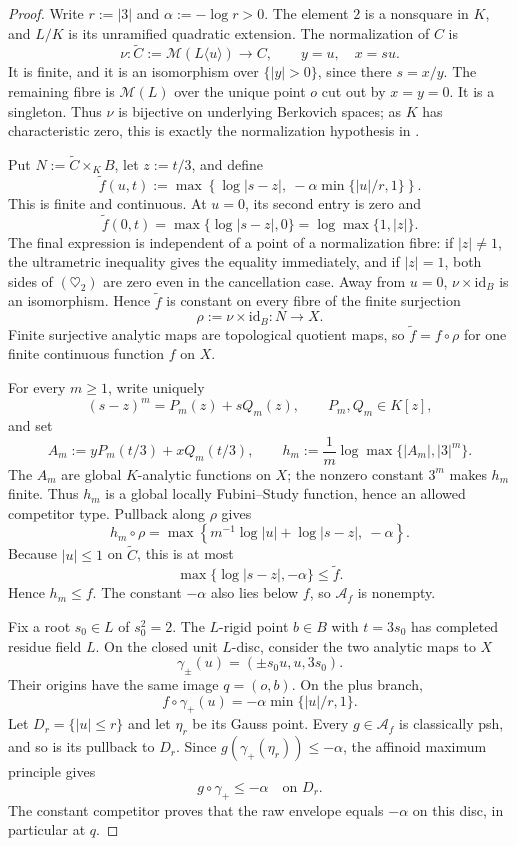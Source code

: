 \begin{proof}
Write \(r:=|3|\) and \(\alpha:=-\log r>0\).  The element \(2\) is a
nonsquare in \(K\), and \(L/K\) is its unramified quadratic extension.  The
normalization of \(C\) is
\[
 \nu:\widetilde C:=\mathcal M(L\langle u\rangle)\longrightarrow C,
 \qquad y=u,\quad x=su.
 \tag{\(\heartsuit\)}
\]
It is finite, and it is an isomorphism over \(\{|y|>0\}\), since there
\(s=x/y\).  The remaining fibre is \(\mathcal M(L)\) over the unique
point \(o\) cut out by \(x=y=0\).  It is a singleton.  Thus \(\nu\) is
bijective on underlying Berkovich spaces; as \(K\) has characteristic zero,
this is exactly the normalization hypothesis in
.

Put \(N:=\widetilde C\times_K B\), let \(z:=t/3\), and define
\[
 \widetilde f(u,t):=
 \max\left\{\log|s-z|,\ -\alpha\min\{|u|/r,1\}\right\}.
 \tag{\(\heartsuit_1\)}
\]
This is finite and continuous.  At \(u=0\), its second entry is zero and
\[
 \widetilde f(0,t)=\max\{\log|s-z|,0\}
                    =\log\max\{1,|z|\}.
 \tag{\(\heartsuit_2\)}
\]
The final expression is independent of a point of a normalization fibre:
if \(|z|\ne1\), the ultrametric inequality gives the equality immediately,
and if \(|z|=1\), both sides of \((\heartsuit_2)\) are zero even in the
cancellation case.  Away from \(u=0\), \(\nu\times\mathrm{id}_B\) is an
isomorphism.  Hence \(\widetilde f\) is constant on every fibre of the
finite surjection
\[
 \rho:=\nu\times\mathrm{id}_B:N\longrightarrow X.
\]
Finite surjective analytic maps are topological quotient maps, so
\(\widetilde f=f\circ\rho\) for one finite continuous function \(f\) on
\(X\).

For every \(m\ge1\), write uniquely
\[
 (s-z)^m=P_m(z)+sQ_m(z),\qquad P_m,Q_m\in K[z],
\]
and set
\[
 A_m:=yP_m(t/3)+xQ_m(t/3),
 \qquad
 h_m:=\frac1m\log\max\{|A_m|,|3|^m\}.
 \tag{\(\heartsuit_3\)}
\]
The \(A_m\) are global \(K\)-analytic functions on \(X\); the nonzero
constant \(3^m\) makes \(h_m\) finite.  Thus \(h_m\) is a global locally
Fubini--Study function, hence an allowed competitor type.  Pullback along
\(\rho\) gives
\[
 h_m\circ\rho=
 \max\left\{m^{-1}\log|u|+\log|s-z|,\ -\alpha\right\}.
 \tag{\(\heartsuit_4\)}
\]
Because \(|u|\le1\) on \(\widetilde C\), this is at most
\[
 \max\{\log|s-z|,-\alpha\}
 \leq\widetilde f.
\]
Hence \(h_m\leq f\).  The constant \(-\alpha\) also lies below \(f\), so
\(\mathcal A_f\) is nonempty.

Fix a root \(s_0\in L\) of \(s_0^2=2\).  The \(L\)-rigid point
\(b\in B\) with \(t=3s_0\) has completed residue field \(L\).  On the
closed unit \(L\)-disc, consider the two analytic maps to \(X\)
\[
 \gamma_\pm(u)=(\pm s_0u,u,3s_0).
\]
Their origins have the same image \(q=(o,b)\).  On the plus branch,
\[
 f\circ\gamma_+(u)=-\alpha\min\{|u|/r,1\}.
 \tag{\(\heartsuit_5\)}
\]
Let \(D_r=\{|u|\le r\}\) and let \(\eta_r\) be its Gauss point.  Every
\(g\in\mathcal A_f\) is classically psh, and so is its pullback to \(D_r\).
Since \(g(\gamma_+(\eta_r))\leq-\alpha\), the affinoid maximum principle
\cite[Theorem~6.4]{GR25Classical} gives
\[
              g\circ\gamma_+\leq-\alpha\quad\text{on }D_r.
\]
The constant competitor proves that the raw envelope equals \(-\alpha\) on
this disc, in particular at \(q\).


\end{proof}
